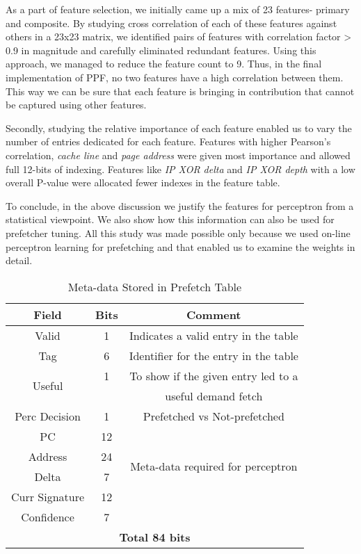 As a part of feature selection, we initially came up a mix of 23
features- primary and composite.  By studying cross correlation of
each of these features against others in a 23x23 matrix, we identified
pairs of features with correlation factor > 0.9 in magnitude and
carefully eliminated redundant features.  Using this approach, we
managed to reduce the feature count to 9.  Thus, in the final
implementation of PPF, no two features have a high correlation
between them.  This way we can be sure that each feature is bringing
in contribution that cannot be captured using other features.

Secondly, studying the relative importance of each feature enabled 
us to vary the number of entries dedicated for each feature.  
Features with higher Pearson's correlation, \textit{cache line} 
and \textit{page address}  were given most importance and
allowed full 12-bits of indexing.  Features like \textit{IP XOR delta} 
and \textit{IP XOR depth} with a low overall P-value 
were allocated fewer indexes in the feature table.

To conclude, in the above discussion we justify the features for
perceptron from a statistical viewpoint.  We also show how this
information can also be used for prefetcher tuning.  All this study
was made possible only because we used on-line perceptron learning for
prefetching and that enabled us to examine the weights in detail.


\begin{table}[ht]
    \centering
    \begin{tabular}{|c|c|c|}
    \hline
        \textbf{Field} &
        \textbf{Bits} &
        \textbf{Comment} \\
    \hline
         Valid 		& 1  & Indicates a valid entry in the table\\
         Tag 		& 6  & Identifier for the entry in the table\\
         \multirow{2}{1cm}{Useful} 	& 1  & To show if the given entry led to a\\
                    	&    & useful demand fetch\\
         Perc Decision 	& 1  & Prefetched vs Not-prefetched \\
    \hline
        PC 		& 12 & \multirow{4}{4.8cm}{Meta-data required for perceptron}\\
        Address 	& 24 & \multirow{4}{1.1cm}{training}\\
        Delta 		& 7  & \\
        Curr Signature 	& 12 & \\
        Confidence 	& 7  & \\
    \hline
        \multicolumn{3}{|c|}{\textbf{Total 84 bits}}\\
    \hline
    \end{tabular}
    \caption{Meta-data Stored in Prefetch Table}
    \label{tab:PTable_metadata}
\end{table}


